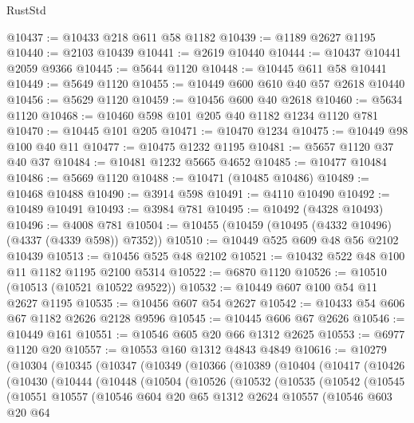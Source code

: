 \begin{lexlean}{RustStd}
\begin{coremodule}
@10437 := @10433 @218 @611 @58 @1182
@10439 := @1189 @2627 @1195
@10440 := @2103 @10439
@10441 := @2619 @10440
@10444 := @10437 @10441 @2059 @9366
@10445 := @5644 @1120
@10448 := @10445 @611 @58 @10441
@10449 := @5649 @1120
@10455 := @10449 @600 @610 @40 @57 @2618 @10440
@10456 := @5629 @1120
@10459 := @10456 @600 @40 @2618
@10460 := @5634 @1120
@10468 := @10460 @598 @101 @205 @40 @1182 @1234 @1120 @781
@10470 := @10445 @101 @205
@10471 := @10470 @1234
@10475 := @10449 @98 @100 @40 @11
@10477 := @10475 @1232 @1195
@10481 := @5657 @1120 @37 @40 @37
@10484 := @10481 @1232 @5665 @4652
@10485 := @10477 @10484
@10486 := @5669 @1120
@10488 := @10471 (@10485 @10486)
@10489 := @10468 @10488
@10490 := @3914 @598
@10491 := @4110 @10490
@10492 := @10489 @10491
@10493 := @3984 @781
@10495 := @10492 (@4328 @10493)
@10496 := @4008 @781
@10504 := @10455 (@10459 (@10495 (@4332 @10496) (@4337 (@4339 @598)) @7352))
@10510 := @10449 @525 @609 @48 @56 @2102 @10439
@10513 := @10456 @525 @48 @2102
@10521 := @10432 @522 @48 @100 @11 @1182 @1195 @2100 @5314
@10522 := @6870 @1120
@10526 := @10510 (@10513 (@10521 @10522 @9522))
@10532 := @10449 @607 @100 @54 @11 @2627 @1195
@10535 := @10456 @607 @54 @2627
@10542 := @10433 @54 @606 @67 @1182 @2626 @2128 @9596
@10545 := @10445 @606 @67 @2626
@10546 := @10449 @161
@10551 := @10546 @605 @20 @66 @1312 @2625
@10553 := @6977 @1120 @20
@10557 := @10553 @160 @1312 @4843 @4849
@10616 := @10279
    (@10304
      (@10345
        (@10347
          (@10349
            (@10366
              (@10389
                (@10404
                  (@10417
                    (@10426
                      (@10430
                        (@10444
                          (@10448
                            (@10504
                              (@10526
                                (@10532
                                  (@10535
                                    (@10542
                                      (@10545
                                        (@10551
                                          @10557
                                          (@10546
                                            @604
                                            @20
                                            @65
                                            @1312
                                            @2624
                                            @10557
                                            (@10546
                                              @603
                                              @20
                                              @64

\end{coremodule}
\end{lexlean}
